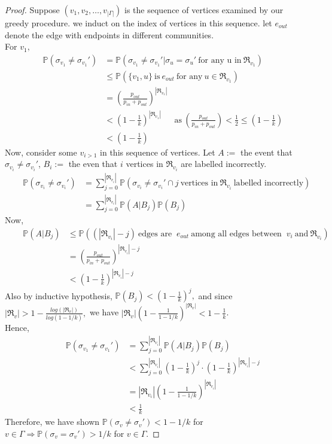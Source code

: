 \begin{proof}
    Suppose $(v_1, v_2, \ldots, v_{|\Gamma|})$ is the sequence of vertices examined by our greedy procedure. we induct on the index of vertices in this sequence. let $e_{out}$ denote the edge with endpoints in different communities.\\
    For $v_1,$ \begin{align*}
    ~~~~~~~~\mathbb{P}(\sigma_{v_1}\neq\sigma_{v_1}')&=\mathbb{P}(\sigma_{v_1}\neq\sigma_{v_1}'|\sigma_u=\sigma_u'~\text{for any u in}~\Re_{v_1})\\
    &\leq\mathbb{P}(\{v_1, u\}~\text{is}~e_{out}~\text{for any}~u\in\Re_{v_1})\\
    &=(\frac{p_{out}}{p_{in}+p_{out}})^{|\Re_{v_1}|}\\
    &<(1-\frac{1}{k})^{|\Re_{v_1}|} ~~~~~~~\text{as}~(\frac{p_{out}}{p_{in}+p_{out}})<\frac{1}{2}\leq(1-\frac{1}{k})\\
    &<(1-\frac{1}{k})
    \end{align*}
    Now, consider some $v_{i>1}$ in this sequence of vertices. Let $A:=$ the event that $\sigma_{v_i}\neq\sigma_{v_i}'$, $B_i:=$ the even that $i$ vertices in $\Re_{v_i}$ are labelled incorrectly. \begin{align*}
    ~~~~~~~~\mathbb{P}(\sigma_{v_i}\neq\sigma_{v_i}')&=\sum_{j=0}^{|\Re_{v_i}|}\mathbb{P}(\sigma_{v_i}\neq\sigma_{v_i}'\cap j~\text{vertices in}~\Re_{v_i}~\text{labelled incorrectly})\\
    &=\sum_{j=0}^{|\Re_{v_i}|}\mathbb{P}(A|B_j)\mathbb{P}(B_j)
    \end{align*}
Now, \begin{align*}
    ~~~~~~~~\mathbb{P}(A|B_j)&\leq\mathbb{P}((|\Re_{v_i}|-j)~\text{edges are }~e_{out}~\text{among all edges between }~v_i~\text{and}~\Re_{v_i})\\
    &=(\frac{p_{out}}{p_{in}+p_{out}})^{|\Re_{v_i}|-j}\\
    &<(1-\frac{1}{k})^{|\Re_{v_i}|-j}
\end{align*} 
Also by inductive hypothesis, $\mathbb{P}(B_j)<(1-\frac{1}{k})^j,$ and since $|\Re_v|>1-\frac{log(|\Re_v|)}{log(1-1/k)},$ we have $|\Re_v|(1-\frac{1}{1-1/k})^{|\Re_v|}<1-\frac{1}{k}$.\\Hence,
\begin{align*}
    ~~~~~~~~\mathbb{P}(\sigma_{v_1}\neq\sigma_{v_1}')&=\sum_{j=0}^{|\Re_{v_i}|}\mathbb{P}(A|B_j)\mathbb{P}(B_j)\\
    &<\sum_{j=0}^{|\Re_{v_i}|}(1-\frac{1}{k})^j\cdot(1-\frac{1}{k})^{|\Re_{v_i}|-j}\\
    &=|\Re_{v_i}|(1-\frac{1}{1-1/k})^{|\Re_{v_i}|}\\
    &<\frac{1}{k}
\end{align*}
Therefore, we have shown $\mathbb{P}(\sigma_{v}\neq\sigma_{v}')<1-1/k$ for $v\in\Gamma \Rightarrow\mathbb{P}(\sigma_{v}=\sigma_{v}')>1/k$ for $v\in\Gamma.$
\end{proof}
